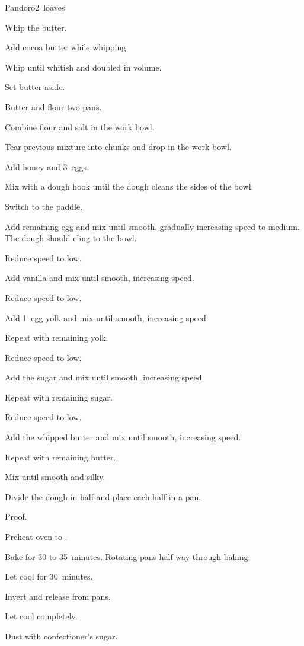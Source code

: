 \begin{recipe}{Pandoro}{}{2~loaves}
\begin{directions}
\item Whip the butter.
\item Add cocoa butter while whipping.
\item Whip until whitish and doubled in volume.
\item Set butter aside.
\item Butter and flour two  pans.
\item Combine flour and salt in the work bowl.
\item Tear previous mixture into chunks and drop in the work bowl.
\item Add honey and 3~eggs.
\item Mix with a dough hook until the dough cleans the sides of the bowl.
\item Switch to the paddle.
\item Add remaining egg and mix until smooth, gradually increasing speed to medium. The dough should cling to the bowl.
\item Reduce speed to low.
\item Add vanilla and mix until smooth, increasing speed.
\item Reduce speed to low.
\item Add 1~egg yolk and mix until smooth, increasing speed.
\item Repeat with remaining yolk.
\item Reduce speed to low.
\item Add \half{} the sugar and mix until smooth, increasing speed.
\item Repeat with remaining sugar.
\item Reduce speed to low.
\item Add \half{} the whipped butter and mix until smooth, increasing speed.
\item Repeat with remaining butter.
\item Mix until smooth and silky.
\item Divide the dough in half and place each half in a pan.
\item Proof.
\end{directions}

\begin{directions}
\item Preheat oven to .
\item Bake for 30 to 35~minutes. Rotating pans half way through baking.
\item Let cool for 30~minutes.
\item Invert and release from pans.
\item Let cool completely.
\item Dust with confectioner's sugar.
\end{directions}

\end{recipe}
